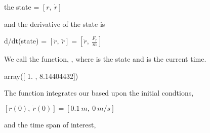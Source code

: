 \documentclass[letterpaper,10pt,english]{sphinxmanual}
\begin{document}
the state = \([r,~\dot{r}]\)

and the derivative of the state is

d/dt(state) = \([\dot{r},~\ddot{r}]=[\dot{r},~\frac{F_r}{m}]\)

We call the function, , where  is the state and  is the current time.

\begin{sphinxVerbatim}[commandchars=\\\{\}]
 
    \PYG{p}{[}\PYG{p}{]}\PYG{p}{[}\PYG{p}{]}
    \PYG{p}{[}\PYG{p}{]}\PYG{p}{[}\PYG{p}{]}\PYG{p}{[}\PYG{p}{]}
     
\end{sphinxVerbatim}

\begin{sphinxVerbatim}[commandchars=\\\{\}]
\PYG{p}{[}\PYG{p}{]}
\end{sphinxVerbatim}

\begin{sphinxVerbatim}[commandchars=\\\{\}]
array([ 1.        ,  8.14404432])
\end{sphinxVerbatim}

The function  integrates our  based upon the initial condtions,

\([r(0),~\dot{r}(0)] = [0.1~m,~0~m/s]\)

and the time span of interest,
\end{document}
